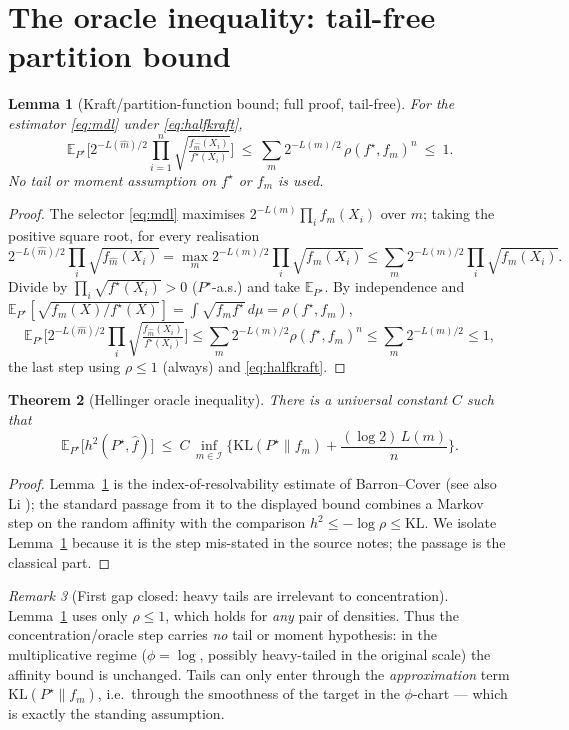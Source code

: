 \documentclass[11pt]{article}
\theoremstyle{plain}
\newtheorem{theorem}{Theorem}[section]
\newtheorem{lemma}[theorem]{Lemma}
\theoremstyle{definition}
\theoremstyle{remark}
\newtheorem{remark}[theorem]{Remark}
\newcommand{\E}{\mathbb{E}}
\newcommand{\KL}{\mathrm{KL}}
\begin{document}
\section{The oracle inequality: tail-free partition bound}

\begin{lemma}[Kraft/partition-function bound; full proof, tail-free]\label{lem:partition}
For the estimator \eqref{eq:mdl} under \eqref{eq:halfkraft},
\[
\E_{P^\star}\!\Big[2^{-L(\widehat m)/2}\prod_{i=1}^n\sqrt{\tfrac{f_{\widehat m}(X_i)}{f^\star(X_i)}}\Big]
\ \le\ \sum_{m}2^{-L(m)/2}\,\rho(f^\star,f_m)^n\ \le\ 1 .
\]
No tail or moment assumption on $f^\star$ or $f_m$ is used.
\end{lemma}

\begin{proof}
The selector \eqref{eq:mdl} maximises $2^{-L(m)}\prod_i f_m(X_i)$ over $m$; taking
the positive square root, for every realisation
\[
2^{-L(\widehat m)/2}\prod_i\sqrt{f_{\widehat m}(X_i)}
=\max_m 2^{-L(m)/2}\prod_i\sqrt{f_m(X_i)}
\le\sum_m 2^{-L(m)/2}\prod_i\sqrt{f_m(X_i)} .
\]
Divide by $\prod_i\sqrt{f^\star(X_i)}>0$ ($P^\star$-a.s.) and take $\E_{P^\star}$.
By independence and
$\E_{P^\star}[\sqrt{f_m(X)/f^\star(X)}]=\int\sqrt{f_m f^\star}\,d\mu=\rho(f^\star,f_m)$,
\[
\E_{P^\star}\Big[2^{-L(\widehat m)/2}\prod_i\sqrt{\tfrac{f_{\widehat m}(X_i)}{f^\star(X_i)}}\Big]
\le\sum_m 2^{-L(m)/2}\rho(f^\star,f_m)^n
\le\sum_m 2^{-L(m)/2}\le1,
\]
the last step using $\rho\le1$ (always) and \eqref{eq:halfkraft}.
\end{proof}

\begin{theorem}[Hellinger oracle inequality]\label{thm:oracle}
There is a universal constant $C$ such that
\[
\E_{P^\star}\big[h^2(P^\star,\widehat f)\big]
\ \le\ C\,\inf_{m\in\mathcal I}\Big\{\KL(P^\star\|f_m)+\frac{(\log2)\,L(m)}{n}\Big\}.
\]
\end{theorem}

\begin{proof}
Lemma~\ref{lem:partition} is the index-of-resolvability estimate of Barron--Cover
\cite{barroncover} (see also Li \cite{li}); the standard passage from it to the
displayed bound combines a Markov step on the random affinity with the comparison
$h^2\le-\log\rho\le\KL$. We isolate Lemma~\ref{lem:partition} because it is the
step mis-stated in the source notes; the passage is the classical part.
\end{proof}

\begin{remark}[First gap closed: heavy tails are irrelevant to concentration]
Lemma~\ref{lem:partition} uses only $\rho\le1$, which holds for \emph{any} pair of
densities. Thus the concentration/oracle step carries \emph{no} tail or moment
hypothesis: in the multiplicative regime ($\phi=\log$, possibly heavy-tailed in
the original scale) the affinity bound is unchanged. Tails can only enter through
the \emph{approximation} term $\KL(P^\star\|f_m)$, i.e.\ through the smoothness of
the target in the $\phi$-chart --- which is exactly the standing assumption.
\end{remark}
\end{document}
